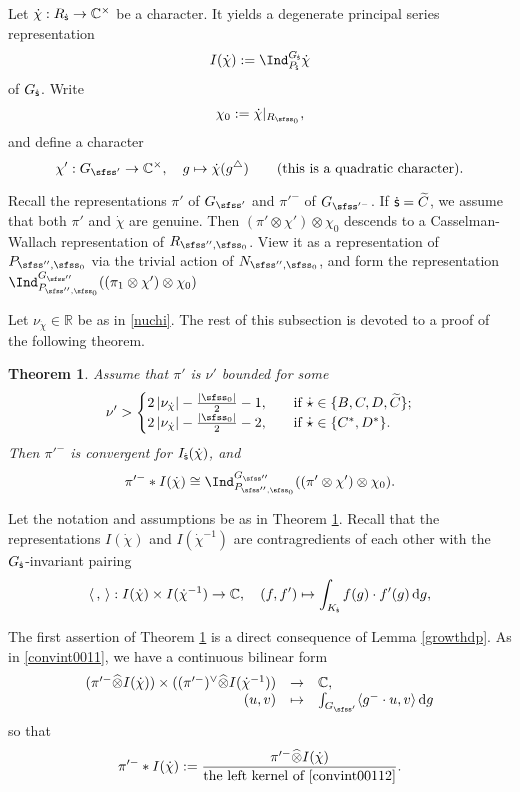 \documentclass[12pt,a4paper]{amsart}
\def\abs#1{\left|{#1}\right|}
\newcommand{\od}{\operatorname{d}}
\newcommand{\R}{\mathbb R}
\newcommand{\la}{\langle}
\newcommand{\ra}{\rangle}
\newcommand{\be}{\begin {equation}}
\newcommand{\ee}{\end {equation}}
\numberwithin{equation}{section}
\newtheorem{thm}{Theorem}[section]
\theoremstyle{remark}
\begin{document}
Let $\dot \chi: R_{{\dot{\mathsf s}}}\rightarrow \mathbb{C}^\times $ be a character. It yields a degenerate principal series representation
\[
I(\dot \chi):=\Ind_{P_\dsfss}^{G_\dsfss} \dot \chi
\]
 of $G_{\dot{\mathsf s}}$.
Write
\be\label{chi0}
  \chi_0:=\dot \chi|_{R_{\sfss_0}},
\ee
and define a character
\be\label{chip}
 \chi':  G_{\sfss'}\rightarrow \C^\times, \quad g\mapsto \dot \chi(g^\triangle) \qquad(\textrm{this is a quadratic character}).
\ee

Recall the representations  $\pi'$  of $G_{\sfss'}$ and
$\pi'^-$ of $G_{\sfss'^-}$. If ${\dot{\mathsf s}}=\widetilde C$, we assume that both $\pi'$ and $\dot \chi$ are genuine.  Then $(\pi'\otimes \chi') \otimes \chi_0$ descends to a Casselman-Wallach representation of $R_{\sfss'',\sfss_0}$. View it as a representation of $P_{\sfss'',\sfss_0}$ via the trivial action of $N_{\sfss'',\sfss_0}$, and form the representation  $\Ind_{P_{\sfss'',\sfss_0}}^{G_{\sfss''}} ((\pi_1\otimes \chi') \otimes \chi_0)$


Let $\nu_{\dot \chi}\in \R$ be  as in \eqref{nuchi}. The rest of this subsection is devoted to a proof of the following theorem.

\begin{thm}\label{midp}
Assume that $\pi'$ is $\nu'$ bounded for some
\[
 \nu'>\begin{cases}
  2\abs{\nu_{\dot \chi}}- \frac{\abs{\sfss_0}}{2}-1,\quad &\textrm{if $\dot \star\in \{B,C,D, \widetilde C\}$};\\
   2\abs{\nu_{\dot \chi}}- \frac{\abs{\sfss_0}}{2}-2,\quad & \textrm{if $\dot \star\in \{C^*,D^*\}$}.
 \end{cases}
\]
 Then $\pi'^-$ is convergent for $I_{{\dot{\mathsf s}}}(\dot \chi)$, and
\[
 \pi'^-*I(\dot \chi)\cong \Ind_{P_{\sfss'',\sfss_0}}^{G_{\sfss''}} ((\pi'\otimes \chi')\otimes \chi_0).
\]
\end{thm}

Let the notation and assumptions be as in Theorem \ref{midp}.
Recall that the representations   $I(\dot \chi)$ and $ I(\dot \chi^{-1})$ are contragredients of each other with the $G_{\dot{\mathsf s}}$-invariant pairing
 \[
  \la\,,\,\ra:  I(\dot \chi)\times I(\dot \chi^{-1})\rightarrow \C, \quad (f, f')\mapsto \int_{K_\dsfss} f(g) \cdot f'(g) \od\!g,
 \]

The first assertion of Theorem \ref{midp} is a direct consequence of Lemma \ref{growthdp}. As in \eqref{convint0011},  we have a continuous bilinear form
\be\label{convint00112}
\begin{array}{rcl}
(\pi'^- \widehat \otimes{ I(\dot \chi)})\times ((\pi'^-)^\vee \widehat \otimes I(\dot \chi^{-1}) )&\rightarrow &\C,\\
 (u,v)&\mapsto& \int_{G_{\sfss'}} \la g^-\cdot u,v\ra \od\! g
 \end{array}
 \ee
so that
\begin{equation}\label{thetab0}
 \pi'^-*I(\dot \chi):=\frac{\pi'^-\widehat \otimes I(\dot \chi)}{\textrm{the left kernel of \eqref{convint00112}}}.
\end{equation}
\end{document}
